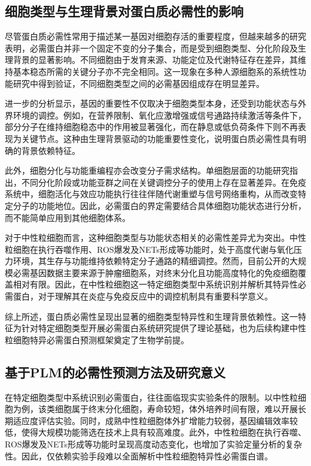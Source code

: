 \subsection{细胞类型与生理背景对蛋白质必需性的影响}

尽管蛋白质必需性常用于描述某一基因对细胞存活的重要程度，但越来越多的研究表明，必需蛋白并非一个固定不变的分子集合，而是受到细胞类型、分化阶段及生理背景的显著影响。不同细胞由于发育来源、功能定位及代谢特征存在差异，其维持基本稳态所需的关键分子亦不完全相同。这一现象在多种人源细胞系的系统性功能研究中得到验证，不同细胞类型之间的必需基因组成存在明显差异\cite{blomen2015gene,wang2015identification}。

进一步的分析显示，基因的重要性不仅取决于细胞类型本身，还受到功能状态与外界环境的调控。例如，在营养限制、氧化应激增强或信号通路持续激活等条件下，部分分子在维持细胞稳态中的作用被显著强化，而在静息或低负荷条件下则不再表现为关键节点\cite{birsoy2014metabolic}。这种由生理背景驱动的功能重要性变化，说明蛋白质必需性具有明确的背景依赖特征。

此外，细胞分化与功能重编程亦会改变分子需求结构。单细胞层面的功能研究指出，不同分化阶段或功能亚群之间在关键调控分子的使用上存在显著差异\cite{replogle2022mapping,zhou2023single}。在免疫系统中，细胞活化与效应功能执行往往伴随代谢重塑与信号网络重构，从而改变特定分子的功能地位\cite{xie2020single}。因此，必需蛋白的界定需要结合具体细胞功能状态进行分析，而不能简单应用到其他细胞体系。

对于中性粒细胞而言，这种细胞类型与功能状态相关的必需性差异尤为突出。中性粒细胞在执行吞噬作用、ROS爆发及NETs形成等功能时，处于高度代谢与氧化压力环境，其生存与功能维持依赖特定分子通路的精细调控。然而，目前公开的大规模必需基因数据主要来源于肿瘤细胞系，对终末分化且功能高度特化的免疫细胞覆盖相对有限。因此，在中性粒细胞这一特定细胞类型中系统识别并解析其特异性必需蛋白，对于理解其在炎症与免疫反应中的调控机制具有重要科学意义。

综上所述，蛋白质必需性呈现出显著的细胞类型特异性和生理背景依赖性。这一特征为针对特定细胞类型开展必需蛋白系统研究提供了理论基础，也为后续构建中性粒细胞特异必需蛋白预测框架奠定了生物学前提。

\subsection{基于PLM的必需性预测方法及研究意义}

在特定细胞类型中系统识别必需蛋白，往往面临现实实验条件的限制。以中性粒细胞为例，该类细胞属于终末分化细胞，寿命较短，体外培养时间有限，难以开展长期适应度评估实验。同时，成熟中性粒细胞体外扩增能力较弱，基因编辑效率较低，使得大规模功能筛选在技术上具有较高难度。此外，中性粒细胞在执行吞噬、ROS爆发及NETs形成等功能时呈现高度动态变化，也增加了实验定量分析的复杂性。因此，仅依赖实验手段难以全面解析中性粒细胞特异性必需蛋白谱。


